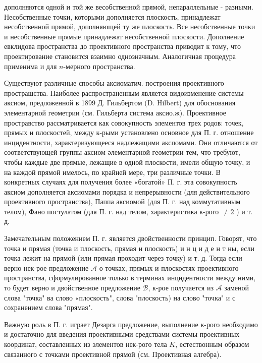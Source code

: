 \documentclass[10pt]{article}
\begin{document}
дополняются одной и той же весобственной прямой, непараллельные - разными. Несобственные точки, которыми дополняется плоскость, принадлежат несобственной прямой, дополняющей ту же плоскость. Все несобственные точки и несобственные прямые принадлежат несобственной плоскости. Дополнение евклидова пространства до проективного пространства приводит к тому, что проектирование становится взаимно однозначным. Аналогичная процедура применима и для $n$-мерного пространства.



Существуют различные способы аксиоматич. построения проективного прострашства. Наиболее распространенным является видоизменение системы аксиом, предложенной в 1899 Д. Гильбертом (D. Hilbert) для обоснования элементарной геометрии (см. Гильберта система аксио.ж). Проективное простравство рассматривается как совокупность элементов трех родов: точек, прямых и плоскостей, между к-рыми установлено основное для П. г. отношение инцидентности, характеризующееся надлежащими акспомами. Они отличаются от соответствующей группы аксиом әлементарной геометрии тем, что требуют, чтобы каждые две прямые, лежащие в одной плоскости, имели общую точку, и на каждой прямой имелось, по крайней мере, три различные точки. В конкретных случаях для получения более «богатой» П. г. эта совокупность аксиом дополняется аксиомами порядка и непрерывности (для действительного проективного пространства), Паппа аксиомой (для П. г. над коммутативным телом), Фано постулатом (для П. г. над телом, характеристика к-рого $\neq 2$ ) и т. д.



Замечательным положением П. г. является двойственности принцип. Говорят, что точка и прямая (точка и плоскость, прямая и плоскость) и н ц и д е н т ны, если точка лежит на прямой (или прямая проходит через точку) и т. д. Тогда если верно нек-рое предложение $\mathcal{A}$ о точках, прямых и плоскостях проективного пространства, сформулированное только в терминах инцидентности между ними, то будет верно и двойственное предложение $\mathscr{B}$, к-рое получается из $\mathcal{A}$ заменой слова "точка" ва слово «плоскость", слова "плоскость) на слово "точка" и с сохранением слова "прямая".



Важную роль в П. г. играет Дезарга предложение, выполнение к-рого необходимо и достаточно для введения проективными средствами системы проективных координат, составленных из элементов нек-рого тела $K$, естествонным образом связанного с точками проективной прямой (см. Проективная алгебра).
\end{document}

